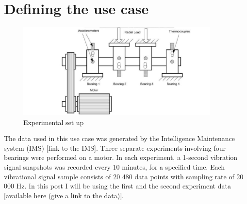 \documentclass[11pt, oneside]{article}   	%
\begin{document}
\section{Defining the use case}
\begin{figure}[H] %
   \centering
   \includegraphics[width=4in]{experiment} 
   \caption{Experimental set up}
   \label{fig:exp}
\end{figure}
The data used in this use case was generated by the Intelligence Maintenance system (IMS) [link to the IMS].
Three separate experiments involving four bearings were performed on a motor. In each experiment, a 1-second vibration signal snapshots was recorded every 10 minutes, for a specified time. Each vibrational signal sample consists of 20 480 data points with sampling rate of 20 000 Hz.
In this post I will be using the first and the second experiment data [available here (give a link to the data)].



\end{document}
